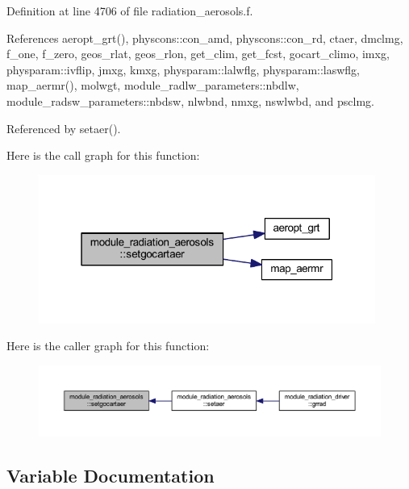 Definition at line 4706 of file radiation\+\_\+aerosols.\+f.



References aeropt\+\_\+grt(), physcons\+::con\+\_\+amd, physcons\+::con\+\_\+rd, ctaer, dmclmg, f\+\_\+one, f\+\_\+zero, geos\+\_\+rlat, geos\+\_\+rlon, get\+\_\+clim, get\+\_\+fcst, gocart\+\_\+climo, imxg, physparam\+::ivflip, jmxg, kmxg, physparam\+::lalwflg, physparam\+::laswflg, map\+\_\+aermr(), molwgt, module\+\_\+radlw\+\_\+parameters\+::nbdlw, module\+\_\+radsw\+\_\+parameters\+::nbdsw, nlwbnd, nmxg, nswlwbd, and psclmg.



Referenced by setaer().



Here is the call graph for this function\+:\nopagebreak
\begin{figure}[H]
\begin{center}
\leavevmode
\includegraphics[width=313pt]{namespacemodule__radiation__aerosols_abb28d29c21a8905eda601bfe5bfb3df4_cgraph}
\end{center}
\end{figure}




Here is the caller graph for this function\+:\nopagebreak
\begin{figure}[H]
\begin{center}
\leavevmode
\includegraphics[width=350pt]{namespacemodule__radiation__aerosols_abb28d29c21a8905eda601bfe5bfb3df4_icgraph}
\end{center}
\end{figure}




\subsection{Variable Documentation}
